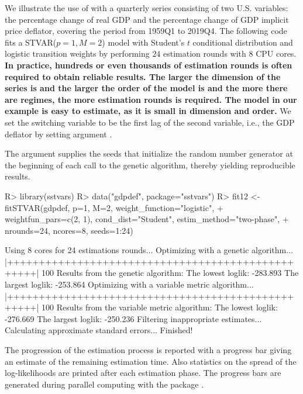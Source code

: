 \documentclass[nojss]{jss}
\begin{document}
We illustrate the use of  with a quarterly series consisting of two U.S. variables: the percentage change of real GDP and the percentage change of GDP implicit price deflator, covering the period from 1959Q1 to 2019Q4. The following code fits a STVAR($p=1,M=2$) model with Student's $t$ conditional distribution and logistic transition weights by performing $24$ estimation rounds with $8$ CPU cores. \textbf{In practice, hundreds or even thousands of estimation rounds is often required to obtain reliable results. The larger the dimension of the series is and the larger the order of the model is and the more there are regimes, the more estimation rounds is required. The model in our example is easy to estimate, as it is small in dimension and order.} We set the switching variable to be the first lag of the second variable, i.e., the GDP deflator by setting argument .

The argument  supplies the seeds that initialize the random number generator at the beginning of each call to the genetic algorithm, thereby yielding reproducible results.
%
\begin{CodeChunk}
\begin{CodeInput}
R> library(sstvars)
R> data("gdpdef", package="sstvars")
R> fit12 <- fitSTVAR(gdpdef, p=1, M=2, weight_function="logistic",
+    weightfun_pars=c(2, 1), cond_dist="Student", estim_method="two-phase",
+    nrounds=24, ncores=8, seeds=1:24)
\end{CodeInput}
\begin{CodeOutput}
Using 8 cores for 24 estimations rounds...
Optimizing with a genetic algorithm...
  |++++++++++++++++++++++++++++++++++++++++++++++++++| 100%
Results from the genetic algorithm:
The lowest loglik:  -283.893
The largest loglik: -253.864
Optimizing with a variable metric algorithm...
  |++++++++++++++++++++++++++++++++++++++++++++++++++| 100%
Results from the variable metric algorithm:
The lowest loglik:  -276.669
The largest loglik: -250.236
Filtering inappropriate estimates...
Calculating approximate standard errors...
Finished!
\end{CodeOutput}
\end{CodeChunk}
%
The progression of the estimation process is reported with a progress bar giving an estimate of the remaining estimation time. Also statistics on the spread of the log-likelihoods are printed after each estimation phase. The progress bars are generated during parallel computing with the package  \citep{Solymos+Zawadzki:2020}.
\end{document}
